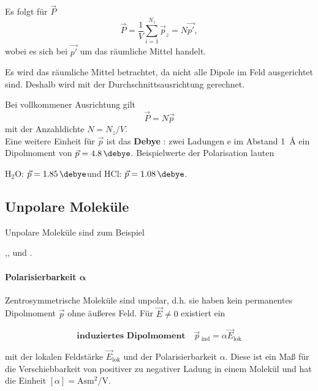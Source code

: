 
    Es folgt für $\vec{P}$
    \begin{equation}
    	\label{2.5}
    	\vec{P} = \frac{1}{V} \sum_{i = 1}^{N_{z}} \vec{p}_{z}= N \vec{p'},
    \end{equation}
    wobei es sich bei $\vec{p'}$ um das räumliche Mittel handelt.
    \begin{verbal}
        Es wird das räumliche Mittel betrachtet, da nicht alle Dipole im Feld ausgerichtet sind. Deshalb wird mit der Durchschnittsausrichtung gerechnet.
    \end{verbal}
    Bei vollkommener Ausrichtung gilt
    \begin{equation}
    	\vec{P} = N \vec{p}
    \end{equation}
    mit der Anzahldichte $N = N_{z}/V$.\\
    
    Eine weitere Einheit für $\vec{p}$ ist das \textbf{Debye} \si{\debye}: zwei Ladungen e im Abstand \SI{1}{\angstrom} ein Dipolmoment von $ \vec{p} = \SI{4,8}{\debye}$. Beispielwerte der Polarisation lauten
    \begin{center}
        H${}_2$O: $\vec p=\SI{1,85}{\debye}$\quad und \quad HCl: $\vec p=\SI{1,08}{\debye}$.
    \end{center}
    \subsection{Unpolare Moleküle}
    Unpolare Moleküle sind zum Beispiel
    \begin{center}
    	,\qquad {},\qquad {} \qquad und \qquad{}.
    \end{center}

\paragraph{Polarisierbarkeit $\bm\alpha$}
    Zentrosymmetrische Moleküle sind unpolar, d.h. sie haben kein permanentes Dipolmoment $\vec{p}$ ohne äußeres Feld. Für $\vec{E} \neq 0$ existiert ein

    \begin{important}
        \begin{equation}
            \textbf{induziertes Dipolmoment}\quad
        	\vec{p}\,_\mathrm{ind} = \alpha \vec{E}_\mathrm{lok}
        \end{equation}
    \end{important}
    mit der lokalen Feldstärke $\vec{E}_{\text{lok}}$ und der {Polarisierbarkeit} $\alpha$. Diese ist ein Maß für die Verschiebbarkeit von positiver zu negativer Ladung in einem Molekül und hat die Einheit $\left[ \alpha \right] = \si{\ampere \second \meter \squared  \per \volt}$.\\
    
